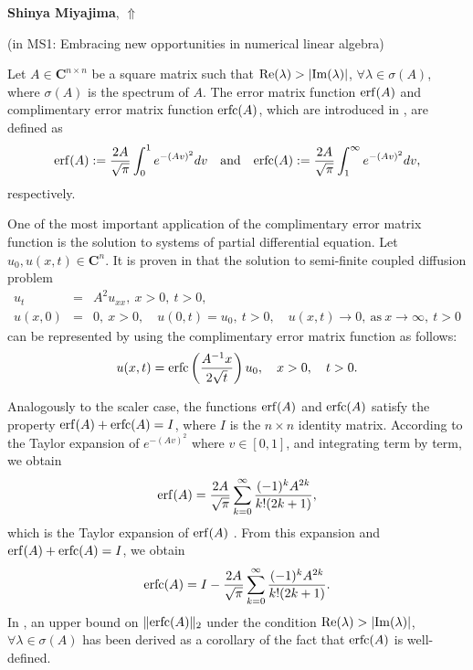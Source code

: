 \documentclass[ILAS2025-program.tex]{subfiles}
\begin{document}
\hypertarget{down0347}{}\begin{ilasabstract}
    
\textbf{Shinya Miyajima},  \hfill \hyperlink{up0347}{$\Uparrow$}
    
    
(in {\color{mstitle}MS1: Embracing new opportunities in numerical linear algebra})
        
\mtskip
    \begin{bibunit}
        Let $A \in \mathbf{C}^{n \times n}$ be a square matrix such that ${\rm Re}(\lambda) > |{\rm Im}(\lambda)|$, $\forall \lambda \in \sigma(A)$, where $\sigma(A)$ is the spectrum of $A$. 
The error matrix function ${\rm erf}(A)$ and complimentary error matrix function ${\rm erfc}(A)$, which are introduced in \cite{Cortes}, are defined as 
$$
{\rm erf}(A) := \frac{2A}{\sqrt{\pi}}\int_{0}^{1} e^{-(Av)^{2}} dv \quad \mbox{and} \quad {\rm erfc}(A) := \frac{2A}{\sqrt{\pi}}\int_{1}^{\infty} e^{-(Av)^{2}} dv,
$$
respectively. 

One of the most important application of the complimentary error matrix function is the solution to systems of partial differential equation. 
Let $u_0, u(x,t) \in \mathbf{C}^n$. 
It is proven in \cite{Cortes} that the solution to semi-finite coupled diffusion problem 
\begin{eqnarray*}
u_{t} &=& A^2u_{xx}, \ x>0, \ t>0, \\
u(x,0) &=& 0, \ x>0, \quad 
u(0,t) = u_{0}, \ t>0, \quad 
u(x,t) \to 0, \ \textrm{as} \ x\rightarrow\infty, \ t > 0
\end{eqnarray*}
can be represented by using the complimentary error matrix function as follows:
$$
u(x,t) = {\rm erfc}\left(\frac{A^{-1}x}{2\sqrt{t}}\right)u_{0}, \quad x>0, \quad t>0. 
$$

Analogously to the scaler case, the functions ${\rm erf}(A)$ and ${\rm erfc}(A)$ satisfy the property ${\rm erf}(A) + {\rm erfc}(A) = I$, where $I$ is the $n \times n$ identity matrix. 
According to the Taylor expansion of $e^{-(Av)^{2}}$ where $v \in [0,1]$, and integrating term by term, we obtain 
$$
{\rm erf}(A) = \frac{2A}{\sqrt{\pi}}\sum_{k=0}^{\infty}\frac{(-1)^k A^{2k}}{k! (2k+1)}, 
$$
which is the Taylor expansion of ${\rm erf}(A)$ \cite{Cortes}. 
From this expansion and ${\rm erf}(A) + {\rm erfc}(A) = I$, we obtain 
$$
{\rm erfc}(A) = I - \frac{2A}{\sqrt{\pi}}\sum_{k=0}^{\infty}\frac{(-1)^k A^{2k}}{k! (2k+1)}. 
$$
In \cite{Cortes}, an upper bound on $\|{\rm erfc}(A)\|_2$ under the condition ${\rm Re}(\lambda) > |{\rm Im}(\lambda)|$, $\forall \lambda \in \sigma(A)$ has been derived as a corollary of the fact that ${\rm erfc}(A)$ is well-defined. 


\end{bibunit}
\end{ilasabstract}
\end{document}
